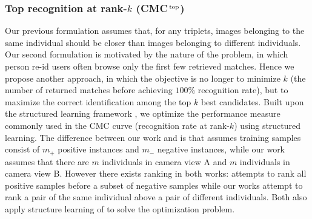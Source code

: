 \documentclass[10pt,twocolumn,letterpaper]{article}
\def\CMCstruct{{\rm CMC$^{\,\rm top}$}\xspace}
\begin{document}
\subsubsection{Top recognition at rank-$k$ (\CMCstruct)}
%
Our previous formulation assumes that, for any triplets,
images belonging to the same individual should be closer
than images belonging to different individuals.
Our second formulation is motivated by the nature of
the problem, in which person re-id users often
browse only the first few retrieved matches.
Hence we propose another approach,
in which the objective is no longer to
minimize $k$ (the number of returned matches
before achieving $100\%$ recognition rate),
but to maximize the correct identification among
the top $k$ best candidates.
Built upon the structured learning
framework \cite{Joachims2005Support, Narasimhan2013Structural},
we optimize the performance measure commonly used in the CMC curve
(recognition rate at rank-$k$) using structured learning.
The difference between our work and \cite{Narasimhan2013Structural}
is that \cite{Narasimhan2013Structural} assumes training samples
consist of $m_{+}$ positive instances and $m_{-}$ negative instances,
while our work assumes that there are $m$ individuals in camera view A
and $m$ individuals in camera view B.
However there exists ranking in both works:
\cite{Narasimhan2013Structural} attempts to rank all positive samples
before a subset of negative samples while
our works attempt
to rank a pair of the same individual above a pair of different individuals.
Both also apply structure learning of \cite{Joachims2005Support}
to solve the optimization problem.
\end{document}
